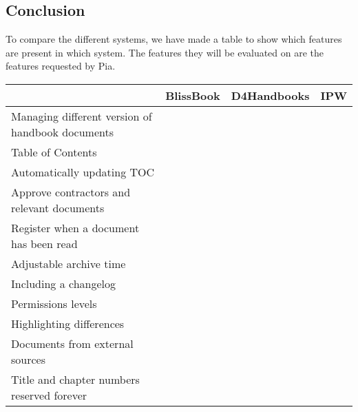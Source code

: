 \subsection{Conclusion}
To compare the different systems, we have made a table to show which features are present in which system. The features they will be evaluated on are the features requested by Pia.
\begin{center}
  \begin{tabular}{| l | c | c | c |}
    \hline
		 & BlissBook & D4Handbooks & IPW \\ \hline
		Managing different version of handbook documents & \checkmark &  &  \\ \hline
		Table of Contents & \checkmark &  &  \\ \hline
		Automatically updating TOC & \checkmark &  &  \\ \hline
		Approve contractors and relevant documents &  &  &  \\ \hline
		Register when a document has been read & \checkmark &  &  \\ \hline
		Adjustable archive time &  &  &  \\ \hline
		Including a changelog &  &  &  \\ \hline
		Permissions levels &  &  &  \\ \hline
		Highlighting differences &  &  &  \\ \hline
		Documents from external sources &  &  &  \\ \hline
		Title and chapter numbers reserved forever &  &  &  \\
    \hline
  \end{tabular}
\end{center}

